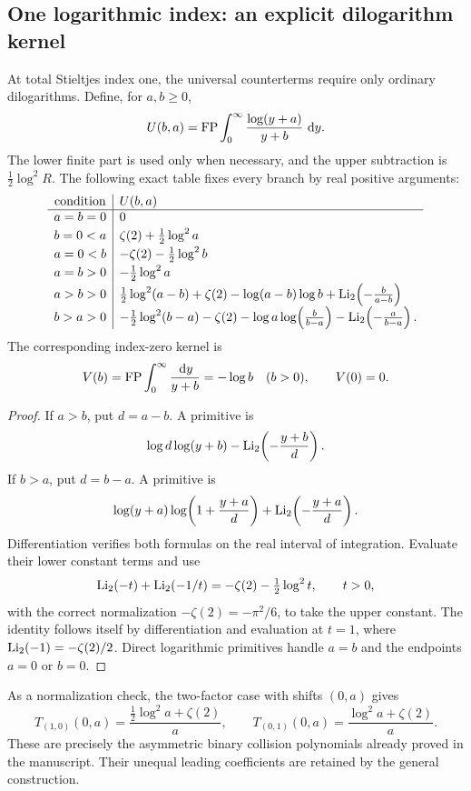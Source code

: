 \subsection{One logarithmic index: an explicit dilogarithm kernel}
\label{gcx:one-log}

At total Stieltjes index one, the universal counterterms require only
ordinary dilogarithms.  Define, for $a,b\ge0$,
\[
 U(b,a)=\operatorname{FP}\int_0^\infty\frac{\log(y+a)}{y+b}\,\,\mathrm d y.
\]
The lower finite part is used only when necessary, and the upper
subtraction is $\tfrac12\log^2R$.  The following exact table fixes every
branch by real positive arguments:
\begin{equation}\label{gcx:U-table}
\begin{array}{c|l}
 \text{condition}& U(b,a)\\ \hline
 a=b=0&0\\[2pt]
 b=0<a&\zeta(2)+\tfrac12\log^2a\\[2pt]
 a=0<b&-\zeta(2)-\tfrac12\log^2b\\[2pt]
 a=b>0&-\tfrac12\log^2a\\[2pt]
 a>b>0&\tfrac12\log^2(a-b)+\zeta(2)
       -\log(a-b)\log b+\operatorname{Li}_2\!\left(-\frac b{a-b}\right)\\[2pt]
 b>a>0&-\tfrac12\log^2(b-a)-\zeta(2)
       -\log a\log\!\left(\frac b{b-a}\right)
       -\operatorname{Li}_2\!\left(-\frac a{b-a}\right).
\end{array}
\end{equation}
The corresponding index-zero kernel is
\[
 V(b)=\operatorname{FP}\int_0^\infty\frac{\,\mathrm d y}{y+b}
       =-\log b\quad(b>0),\qquad V(0)=0.
\]

\begin{proof}
If $a>b$, put $d=a-b$.  A primitive is
\[
 \log d\log(y+b)-\operatorname{Li}_2\!\left(-\frac{y+b}{d}\right).
\]
If $b>a$, put $d=b-a$.  A primitive is
\[
 \log(y+a)\log\!\left(1+\frac{y+a}{d}\right)
       +\operatorname{Li}_2\!\left(-\frac{y+a}{d}\right).
\]
Differentiation verifies both formulas on the real interval of
integration.  Evaluate their lower constant terms and use
\[
 \operatorname{Li}_2(-t)+\operatorname{Li}_2(-1/t)=-\zeta(2)-\tfrac12\log^2t,
 \qquad t>0,
\]
with the correct normalization $-\zeta(2)=-\pi^2/6$, to take the upper
constant.  The identity follows itself by differentiation and evaluation
at $t=1$, where $\operatorname{Li}_2(-1)=-\zeta(2)/2$.  Direct logarithmic primitives
handle $a=b$ and the endpoints $a=0$ or $b=0$.
\end{proof}

As a normalization check, the two-factor case with shifts $(0,a)$ gives
\[
 T_{(1,0)}(0,a)=\frac{\tfrac12\log^2a+\zeta(2)}a,\qquad
 T_{(0,1)}(0,a)=\frac{\log^2a+\zeta(2)}a.
\]
These are precisely the asymmetric binary collision polynomials already
proved in the manuscript.  Their unequal leading coefficients are
retained by the general construction.

